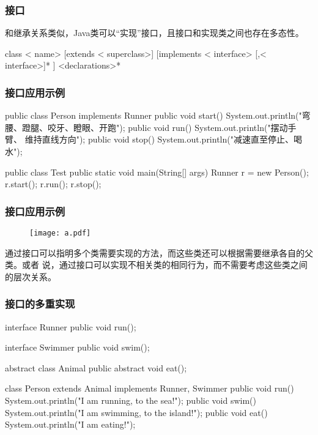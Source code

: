 \begin{frame}[fragile] %
\frametitle{接口}

和继承关系类似，Java类可以“实现”接口，且接口和实现类之间也存在多态性。
\begin{javaCode}
[< modifier>] class < name> [extends < superclass>]
[implements < interface> [,< interface>]* ] {
<declarations>*
}
\end{javaCode}
\end{frame}

\begin{frame}[fragile] %
\frametitle{接口应用示例}

\begin{javaCode}
public class Person implements Runner {
  public void start() {
    System.out.println("弯腰、蹬腿、咬牙、瞪眼、开跑");
  }
  public void run(){
    System.out.println("摆动手臂、 维持直线方向");
  }
  public void stop(){
    System.out.println("减速直至停止、喝水");
  }
}
\end{javaCode}

\begin{javaCode}
public class Test {
  public static void main(String[] args) {
    Runner r = new Person();
    r.start();
    r.run();
    r.stop();
  }
}
\end{javaCode}
\end{frame}

\begin{frame}[fragile] %
\frametitle{接口应用示例}

\begin{figure}
\centering
\texttt{[image: a.pdf]}
\end{figure}

通过接口可以指明多个类需要实现的方法，而这些类还可以根据需要继承各自的父类。或者
说，{\Mage 通过接口可以实现不相关类的相同行为，而不需要考虑这些类之间的层次关系。}
\end{frame}

\begin{frame}[fragile] %
\frametitle{接口的多重实现}
\begin{javaCode}
interface Runner {
  public void run();
}
\end{javaCode}

\begin{javaCode}
interface Swimmer {
  public void swim();
}
\end{javaCode}
\begin{javaCode}
abstract class Animal {
  public abstract void eat();
}
\end{javaCode}
\begin{javaCode}
class Person extends Animal implements Runner, Swimmer {
  public void run() {
    System.out.println("I am running, to the sea!");
  }
  public void swim() {
    System.out.println("I am swimming, to the island!");
  }
  public void eat() {
    System.out.println("I am eating!");
  }
}
\end{javaCode}
\end{frame}

